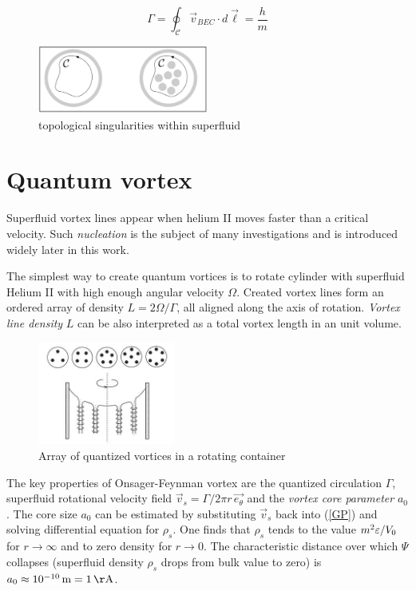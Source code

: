 \begin{equation}
\Gamma = \oint_{\mathcal{C}} \vec{v}_{BEC} \cdot \unit{d}\vec{\boldsymbol{\ell}} = \frac{h}{m}
\label{gamma}
\end{equation}

\begin{figure}[h]
	\centering
	\includegraphics[width=0.5\textwidth]{graphics/theory/singularity}
	\caption{topological singularities within superfluid}
	\label{singularity}
\end{figure}

\newpage

\section{Quantum vortex}

Superfluid vortex lines appear when helium II moves faster than a critical velocity. Such \textit{nucleation} is the subject of many investigations and is introduced widely later in this work.

The simplest way to create quantum vortices is to rotate cylinder with superfluid Helium II with high enough angular velocity $\Omega$. Created vortex lines form an ordered array of density $L=2\Omega / \Gamma$, all aligned along the axis of rotation. \textit{Vortex line density} $L$ can be also interpreted as a total vortex length in an unit volume.

\begin{figure}[h]
	\centering
	\includegraphics[width=0.4\textwidth]{graphics/theory/rotating-helium}
	\caption{Array of quantized vortices in a rotating container}
	\label{rotating-helium}
\end{figure}

The key properties of Onsager-Feynman vortex are the quantized circulation $\Gamma$, superfluid rotational velocity field $\vec{v}_s = \Gamma / 2\pi r\, \vec{e_{\theta}}$ and the \textit{vortex core parameter} $a_0$. The core size $a_0$ can be estimated by substituting $\vec{v}_s$ back into (\ref{GP}) and solving differential equation for $\rho_s$. One finds that $\rho_s$ tends to the value $m^2 \varepsilon / V_0$ for $r \rightarrow \infty$ and to zero density for $r \rightarrow 0$.
The characteristic distance over which $\Psi$ collapses (superfluid density $\rho_s$ drops from bulk value to zero) is $a_0 \approx 10^{-10} \unit{m} = 1 \unit{\AA}$.

